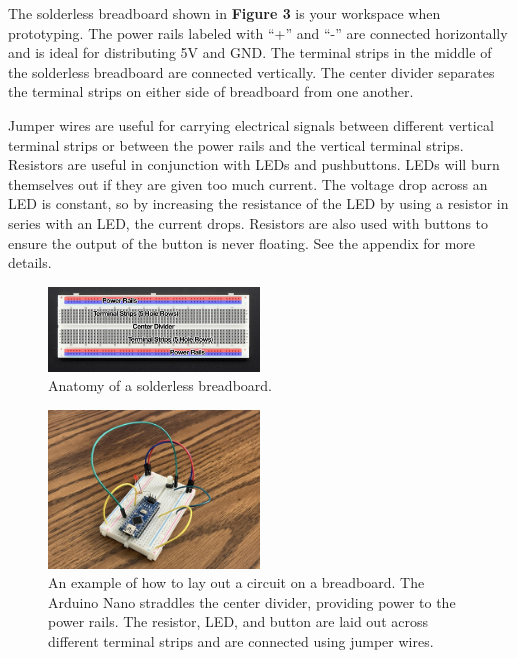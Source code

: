 \documentclass{article}
\begin{document}
The solderless breadboard shown in {\bf Figure 3} is your workspace when prototyping. The power rails labeled with ``+'' and ``-'' are connected horizontally and is ideal for distributing 5V and GND. The terminal strips in the middle of the solderless breadboard are connected vertically. The center divider separates the terminal strips on either side of breadboard from one another. \par

Jumper wires are useful for carrying electrical signals between different vertical terminal strips or between the power rails and the vertical terminal strips. Resistors are useful in conjunction with LEDs and pushbuttons. LEDs will burn themselves out if they are given too much current. The voltage drop across an LED is constant, so by increasing the resistance of the LED by using a resistor in series with an LED, the current drops. Resistors are also used with buttons to ensure the output of the button is never floating. See the appendix for more details.


\begin{figure}[ht]
    \centering
    \includegraphics[width = 0.5\textwidth]{images/breadboard_diagram.jpg}
    \cprotect\caption{Anatomy of a solderless breadboard.}
\end{figure}

\begin{figure}[ht]
    \centering
    \includegraphics[width = 0.5\textwidth]{images/breadboard_example.jpg}
    \cprotect\caption{An example of how to lay out a circuit on a breadboard. The Arduino Nano straddles the center divider, providing power to the power rails. The resistor, LED, and button are laid out across different terminal strips and are connected using jumper wires.}
\end{figure}
\end{document}
